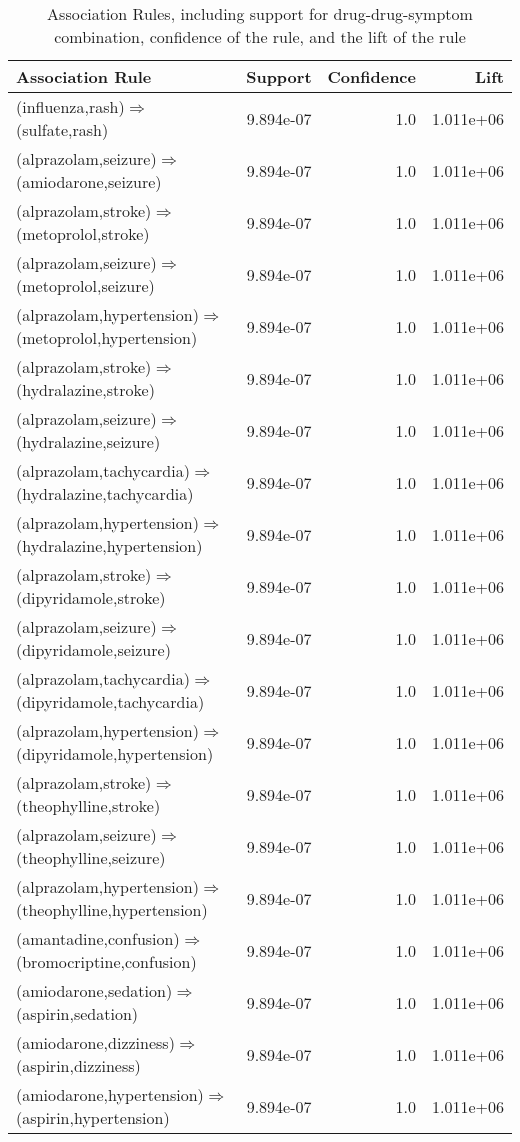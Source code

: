 \documentclass[letterpaper]{article}
\begin{document}
\begin{table}
\centering
\begin{tabular}{lrrr}
\hline
Association Rule & Support & Confidence & Lift \\
\hline
(influenza,rash)$\Rightarrow$(sulfate,rash) & 9.894e-07 & 1.0 & 1.011e+06\\
(alprazolam,seizure)$\Rightarrow$(amiodarone,seizure) & 9.894e-07 & 1.0 & 1.011e+06\\
(alprazolam,stroke)$\Rightarrow$(metoprolol,stroke) & 9.894e-07 & 1.0 & 1.011e+06\\
(alprazolam,seizure)$\Rightarrow$(metoprolol,seizure) & 9.894e-07 & 1.0 & 1.011e+06\\
(alprazolam,hypertension)$\Rightarrow$(metoprolol,hypertension) & 9.894e-07 & 1.0 & 1.011e+06\\
(alprazolam,stroke)$\Rightarrow$(hydralazine,stroke) & 9.894e-07 & 1.0 & 1.011e+06\\
(alprazolam,seizure)$\Rightarrow$(hydralazine,seizure) & 9.894e-07 & 1.0 & 1.011e+06\\
(alprazolam,tachycardia)$\Rightarrow$(hydralazine,tachycardia) & 9.894e-07 & 1.0 & 1.011e+06\\
(alprazolam,hypertension)$\Rightarrow$(hydralazine,hypertension) & 9.894e-07 & 1.0 & 1.011e+06\\
(alprazolam,stroke)$\Rightarrow$(dipyridamole,stroke) & 9.894e-07 & 1.0 & 1.011e+06\\
(alprazolam,seizure)$\Rightarrow$(dipyridamole,seizure) & 9.894e-07 & 1.0 & 1.011e+06\\
(alprazolam,tachycardia)$\Rightarrow$(dipyridamole,tachycardia) & 9.894e-07 & 1.0 & 1.011e+06\\
(alprazolam,hypertension)$\Rightarrow$(dipyridamole,hypertension) & 9.894e-07 & 1.0 & 1.011e+06\\
(alprazolam,stroke)$\Rightarrow$(theophylline,stroke) & 9.894e-07 & 1.0 & 1.011e+06\\
(alprazolam,seizure)$\Rightarrow$(theophylline,seizure) & 9.894e-07 & 1.0 & 1.011e+06\\
(alprazolam,hypertension)$\Rightarrow$(theophylline,hypertension) & 9.894e-07 & 1.0 & 1.011e+06\\
(amantadine,confusion)$\Rightarrow$(bromocriptine,confusion) & 9.894e-07 & 1.0 & 1.011e+06\\
(amiodarone,sedation)$\Rightarrow$(aspirin,sedation) & 9.894e-07 & 1.0 & 1.011e+06\\
(amiodarone,dizziness)$\Rightarrow$(aspirin,dizziness) & 9.894e-07 & 1.0 & 1.011e+06\\
(amiodarone,hypertension)$\Rightarrow$(aspirin,hypertension) & 9.894e-07 & 1.0 & 1.011e+06\\
\hline
\end{tabular}
\caption{\label{AssocRules} Association Rules, including support for drug-drug-symptom combination, confidence of the rule, and the lift of the rule}
\end{table}
\end{document}

